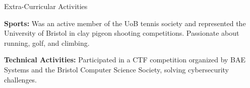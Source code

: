 \documentclass{resume} %
\begin{document}

\begin{rSection}{Extra-Curricular Activities} 
\vspace{-1.25em}

\item \textbf{Sports:}
Was an active member of the UoB tennis society and represented the University of Bristol in clay pigeon shooting competitions. Passionate about running, golf, and climbing. \\
\vspace{-1.25em}

\item \textbf{Technical Activities:}
Participated in a CTF competition organized by BAE Systems and the Bristol Computer Science Society, solving cybersecurity challenges.

\end{rSection}
\end{document}
